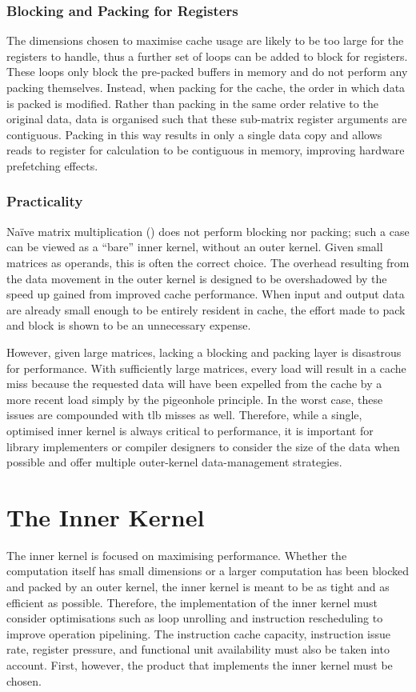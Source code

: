 \documentclass[\main/thesis.tex]{subfiles}
\begin{document}
\subsubsection{Blocking and Packing for Registers}
The dimensions chosen to maximise cache usage are likely to be too large for the registers to handle, thus a further set of loops can be added to block for registers.
These loops only block the pre-packed buffers in memory and do not perform any packing themselves.
Instead, when packing for the cache, the order in which data is packed is modified.
Rather than packing in the same order relative to the original data, data is organised such that these sub-matrix register arguments are contiguous.
Packing in this way results in only a single data copy and allows reads to register for calculation to be contiguous in memory, improving hardware prefetching effects.

\subsubsection{Practicality}
Na\"ive matrix multiplication (\ie {}) does not perform blocking nor packing; such a case can be viewed as a ``bare'' inner kernel, without an outer kernel.
Given small matrices as operands, this is often the correct choice.
The overhead resulting from the data movement in the outer kernel is designed to be overshadowed by the speed up gained from improved cache performance.
When input and output data are already small enough to be entirely resident in cache, the effort made to pack and block is shown to be an unnecessary expense.

However, given large matrices, lacking a blocking and packing layer is disastrous for performance.
With sufficiently large matrices, every load will result in a cache miss because the requested data will have been expelled from the cache by a more recent load simply by the pigeonhole principle.
In the worst case, these issues are compounded with \gls{tlb} misses as well.
Therefore, while a single, optimised inner kernel is always critical to performance, it is important for library implementers or compiler designers to consider the size of the data when possible and offer multiple outer-kernel data-management strategies.

\section{The Inner Kernel}
\label{sec:innerKernel}
The inner kernel is focused on maximising performance.
Whether the computation itself has small dimensions or a larger computation has been blocked and packed by an outer kernel, the inner kernel is meant to be as tight and as efficient as possible.
Therefore, the implementation of the inner kernel must consider optimisations such as loop unrolling and instruction rescheduling to improve operation pipelining.
The instruction cache capacity, instruction issue rate, register pressure, and functional unit availability must also be taken into account.
First, however, the product that implements the inner kernel must be chosen.
\end{document}
